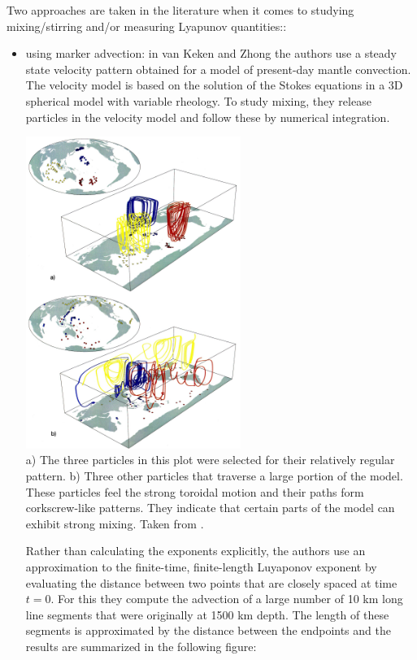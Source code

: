 Two approaches are taken in the literature when it comes to studying mixing/stirring and/or measuring Lyapunov quantities::

\begin{itemize}
\item using marker advection: in van Keken and Zhong \cite{vazh99} the authors use a steady state velocity
pattern obtained for a model of present-day mantle convection. The velocity model is
based on the solution of the Stokes equations in a 3D spherical model with variable rheology.
To study mixing, they release particles in the velocity model and follow 
these by numerical integration. 

\begin{center}
\includegraphics[width=7cm]{images/mixing/vazh99}\\
{\captionfont a) The three particles in this plot were
selected for their relatively regular pattern. 
b) Three other particles that traverse a large portion of the model. These particles feel 
the strong toroidal motion and their paths form corkscrew-like patterns. 
They indicate that certain parts of the model can exhibit strong mixing.  Taken from \cite{vazh99}.}
\end{center}

Rather than calculating the exponents explicitly, the authors 
use an approximation to the finite-time,
finite-length Luyaponov exponent by evaluating the distance between two points that are closely spaced
at time $t=0$. For this they compute the advection of a
large number of 10 km long line segments that were
originally at 1500 km depth. The length of these segments is approximated by the distance between the
endpoints and the results are summarized in the following figure:


\end{itemize}
